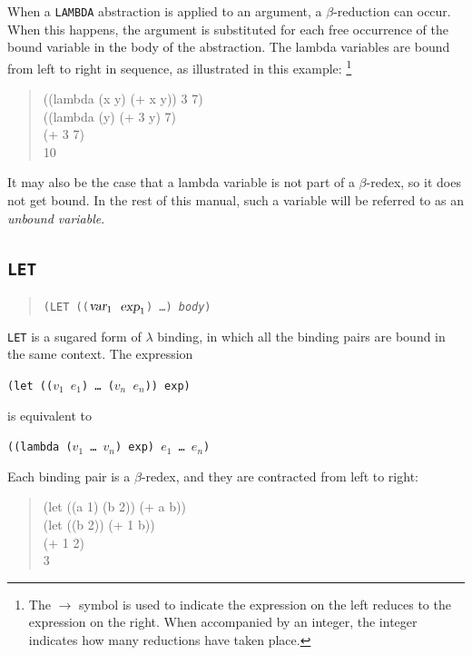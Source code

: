 	When a {\tt LAMBDA} abstraction is applied to an argument, a
$\beta$-reduction can occur.  When this happens, the argument is
substituted for each free occurrence of the bound variable  in
the body of the abstraction.  The lambda variables are  
bound from left to right in sequence, as illustrated in this example:
	\footnote{The $\longrightarrow$ symbol is used to indicate the 
		expression on the left reduces to the expression on the right.  
		When accompanied by an integer, the integer indicates how many 
		reductions have taken place. }
\begin{quote}
\begin{tt}
	((lambda (x y) (+ x y)) 3 7) \reds \\
	((lambda (y) (+ 3 y) 7) \reds \\
	(+ 3 7) \reds \\
	10
\end{tt}
\end{quote}

	It may also be the case that a lambda variable is not part of a 
$\beta$-redex, so it does not get bound.  In the rest of this manual,
such a variable will be referred to as an {\em unbound variable}.


\subsection{\tt LET}

\begin{quote}
	{\tt (LET ((${\mbox{\sl var}}_1$ ${\mbox{\sl exp}}_1$) \ldots) 
				{\sl body})}
\end{quote}

	{\tt LET} is a sugared form of $\lambda$ binding, in which
all the binding pairs are bound in the same context. 
The expression 
\begin{center}
{\mbox{\tt (let (($v_1$ $e_1$) \ldots\ ($v_n$ $e_n$)) exp)}} 
\end{center}
is equivalent to 
\begin{center}
{\mbox{\tt ((lambda ($v_1$ \ldots\ $v_n$) exp) $e_1$ \ldots\ $e_n$)}}
\end{center}
Each binding pair is a $\beta$-redex, and they are contracted from left
to right:
\begin{quote}
\begin{tt}
	(let ((a 1) (b 2)) (+ a b)) \reds \\
	(let ((b 2)) (+ 1 b)) \reds \\
	(+ 1 2) \reds \\
	3
\end{tt}
\end{quote}

